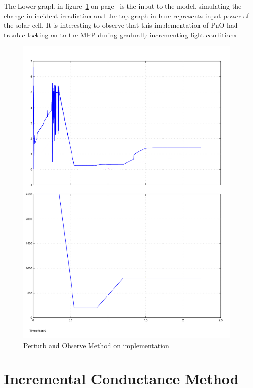  The Lower graph in figure~\ref{fig:PnO_result} on page~\pageref{fig:PnO_result} is the input to the model, simulating the change in incident irradiation and the top graph in blue represents input power of the solar cell. It is interesting to observe that this implementation of \ac{PnO} had trouble locking on to the \ac{MPP} during gradually incrementing light conditions.                       
  \begin{figure}[H]
	   \begin{center}
		   \includegraphics[width=\textwidth]{images/P&O_changing_lux-1}
		   \caption{Perturb and Observe Method on implementation   }
		   \label{fig:PnO_result}
	   \end{center}
   \end{figure}
   
 \section{Incremental Conductance Method }
 

